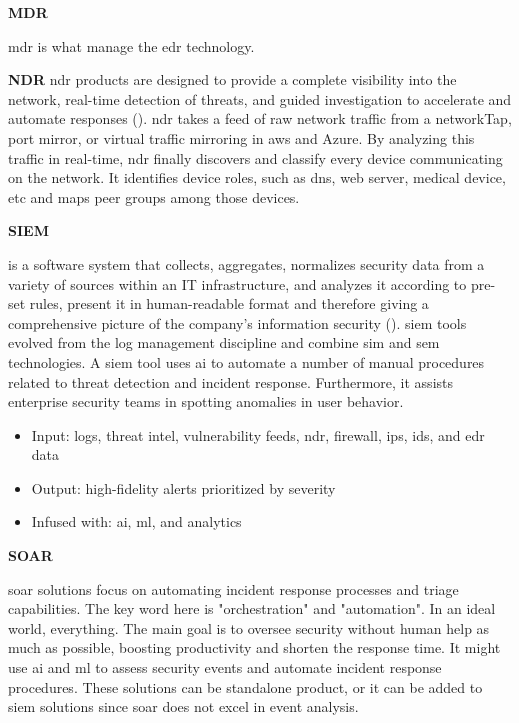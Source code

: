 \begin{multicols}{2}
      \textbf{MDR}

      \acrshort{mdr} is what manage the \acrshort{edr} technology.

      \textbf{NDR} \label{sec:ndr}
      \acrshort{ndr} products are designed to provide a complete visibility into the network, real-time detection of threats, and guided investigation
      to accelerate and automate responses (\textit{\cite{sentinelOneNDR}}). \acrshort{ndr} takes a feed of raw network traffic from a \gls{networkTap},
      port mirror, or virtual traffic mirroring in \acrshort{aws} and Azure. By analyzing this traffic in real-time, \acrshort{ndr} finally discovers
      and classify every device communicating on the network. It identifies device roles, such as \acrshort{dns}, web server, medical device, \acrshort{etc}
      and maps peer groups among those devices.

      \textbf{SIEM}

      is a software system that collects, aggregates, normalizes security data from a variety of sources within an IT infrastructure, and
      analyzes it according to pre-set rules, present it in human-readable format and therefore giving a comprehensive picture of the company's
      information security (\cite{siemGartner}). \acrshort{siem} tools evolved from the log management discipline and combine \acrshort{sim} and
      \acrshort{sem} technologies. A \acrshort{siem} tool uses \acrshort{ai} to automate a number of manual procedures related to threat detection
      and incident response. Furthermore, it assists enterprise security teams in spotting anomalies in user behavior.

      \begin{itemize}
            \item Input: logs, threat intel, vulnerability feeds, \acrshort{ndr}, firewall, \acrshort{ips}, \acrshort{ids}, and \acrshort{edr} data
            \item Output: high-fidelity alerts prioritized by severity
            \item Infused with: \acrshort{ai}, \acrshort{ml}, and analytics
      \end{itemize}

      \textbf{SOAR}

      \acrshort{soar} solutions focus on automating incident response processes and triage capabilities. The key word here is
      "orchestration" and "automation". In an ideal world, everything.
      The main goal is to oversee security without human help as much as possible, boosting productivity and shorten the response time.
      It might use \acrshort{ai} and \acrshort{ml} to assess security events and automate incident response procedures. These solutions
      can be standalone product, or it can be added to \acrshort{siem} solutions since \acrshort{soar} does not excel in event analysis.


\end{multicols}
